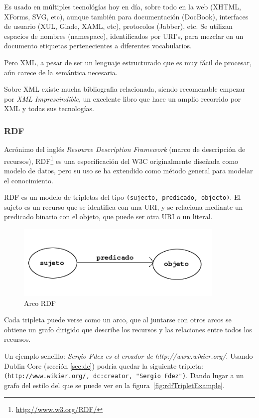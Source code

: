 Es usado en múltiples tecnológías hoy en día, sobre todo en la web (XHTML, XForms, 
SVG, etc), aunque también para documentación (DocBook), interfaces de usuario (XUL,
Glade, XAML, etc), protocolos (Jabber), etc. Se utilizan espacios de nombres (namespace), 
identificados por URI's, para mezclar en un documento etiquetas pertenecientes a 
diferentes vocabularios.

Pero XML, a pesar de ser un lenguaje estructurado que es muy fácil de procesar, 
aún carece de la semántica necesaria. 

Sobre XML existe mucha bibliografia relacionada, siendo recomenable empezar por
\emph{XML Imprescindible}\cite{XMLNutshell}, un excelente libro que hace un amplio
recorrido por XML y todas sus tecnologías.

\subsubsection{RDF}

Acrónimo del inglés \emph{Resource Description Framework} (marco de descripción 
de recursos), RDF\footnote{\url{http://www.w3.org/RDF/}} es una especificación del 
W3C originalmente diseñada como modelo de datos, pero su uso se ha extendido como
método general para modelar el conocimiento.

RDF es un modelo de tripletas del tipo \texttt{(sujecto, predicado, objecto)}. El
sujeto es un recurso que se identifica con una URI, y se relaciona mediante un 
predicado binario con el objeto, que puede ser otra URI o un literal.

\begin{figure}[ht]
	\centering
	\includegraphics[width=10cm]{images/arc.png}
	\caption{Arco RDF}
	\label{fig:rdfTriplet}
\end{figure}

Cada tripleta puede verse como un arco, que al juntarse con otros arcos se obtiene
un grafo dirigido que describe los recursos y las relaciones entre todos los 
recursos.

Un ejemplo sencillo: \textit{Sergio Fdez es el creador de http://www.wikier.org/}. 
Usando Dublin Core (sección \ref{sec:dc}) podría quedar la siguiente tripleta: 
\texttt{(http://www.wikier.org/, dc:creator, "Sergio Fdez")}. Dando lugar a un 
grafo del estilo del que se puede ver en la figura~\ref{fig:rdfTripletExample}.

